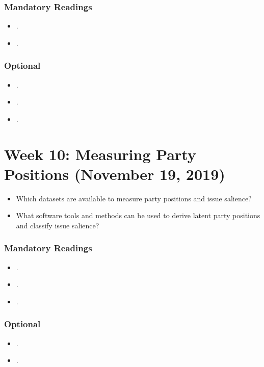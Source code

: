 \documentclass[abstract=on,parskip=full,headings=standardclasses,fontsize=11pt,paper=a4]{scrartcl}
\begin{document}
\subsubsection*{Mandatory Readings}
\begin{itemize}
\item {}.
\item {}.
\end{itemize}


\subsubsection*{Optional}
\begin{itemize}
\item {}.
\item {}.
\item {}.
\end{itemize}


\section{Week 10:  Measuring Party Positions (November 19, 2019)}

\begin{itemize}
\renewcommand\labelitemi{--}
\item Which datasets are available to measure party positions and issue salience?
\item What software tools and methods can be used to derive latent party positions and classify issue salience?
\end{itemize}


\subsubsection*{Mandatory Readings}
\begin{itemize}
\item {}.
\item {}.
\item {}.
\end{itemize}


\subsubsection*{Optional}
\begin{itemize}
\item {}.
\item {}.
\end{itemize}
\end{document}
